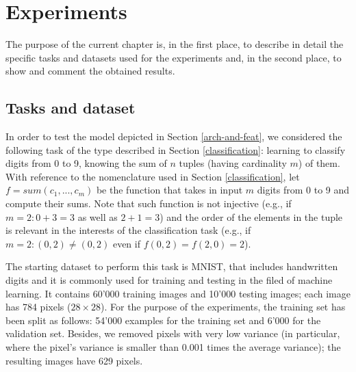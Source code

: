 \chapter{Experiments}
\label{ChapterExp}

The purpose of the current chapter is, in the first place, to describe in detail the specific tasks and datasets used for the experiments and, in the second place, to show and comment the obtained results.   

\section{Tasks and dataset}
\label{tasks-dataset}

In order to test the model depicted in Section \ref{arch-and-feat}, we considered the following task of the type described in Section \ref{classification}: learning to classify digits from 0 to 9, knowing the sum of $\mathit{n}$ tuples (having cardinality $\mathit{m}$) of them. With reference to the nomenclature used in Section \ref{classification}, let $\mathit{f} = sum(\mathit{c}_1,...,\mathit{c}_m)$ be the function that takes in input $\mathit{m}$ digits from 0 to 9 and compute their sums. Note that such function is not injective (e.g., if $m = 2: 0+3=3$ as well as $2+1=3$) and the order of the elements in the tuple is relevant in the interests of the classification task (e.g., if $m =2: (0,2) \neq (0,2)$ even if $\mathit{f}(0,2) = \mathit{f}(2,0) = 2$).

The starting dataset to perform this task is MNIST, that includes handwritten digits and it is commonly used for training and testing in the filed of machine learning. It contains 60'000 training images and 10'000 testing images; each image has 784 pixels ($28 \times 28$). For the purpose of the experiments, the training set has been split as follows: 54'000 examples for the training set and 6'000 for the validation set. Besides, we removed pixels with very low variance (in particular, where the pixel's variance is smaller than 0.001 times the average variance); the resulting images have 629 pixels. 

